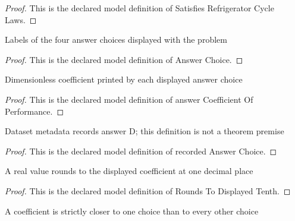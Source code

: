 \begin{proof}
  This is the declared model definition of Satisfies Refrigerator Cycle Laws.
\end{proof}
\begin{definition}
  \label{def:physics:phyx-mini-0423:phyxminiproblems-problemphyxmini0423-answerchoice}
  Labels of the four answer choices displayed with the problem
\end{definition}
\begin{proof}
  This is the declared model definition of Answer Choice.
\end{proof}
\begin{definition}
  \label{def:physics:phyx-mini-0423:phyxminiproblems-problemphyxmini0423-answercoefficientofperformance}
  Dimensionless coefficient printed by each displayed answer choice
\end{definition}
\begin{proof}
  This is the declared model definition of answer Coefficient Of Performance.
\end{proof}
\begin{definition}
  \label{def:physics:phyx-mini-0423:phyxminiproblems-problemphyxmini0423-recordedanswerchoice}
  Dataset metadata records answer D; this definition is not a theorem premise
\end{definition}
\begin{proof}
  This is the declared model definition of recorded Answer Choice.
\end{proof}
\begin{definition}
  \label{def:physics:phyx-mini-0423:phyxminiproblems-problemphyxmini0423-roundstodisplayedtenth}
  A real value rounds to the displayed coefficient at one decimal place
\end{definition}
\begin{proof}
  This is the declared model definition of Rounds To Displayed Tenth.
\end{proof}
\begin{definition}
  \label{def:physics:phyx-mini-0423:phyxminiproblems-problemphyxmini0423-isuniqueclosestdisplayedanswer}
  A coefficient is strictly closer to one choice than to every other choice
\end{definition}
